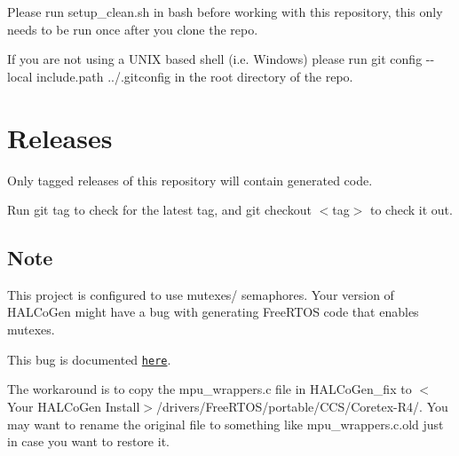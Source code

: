 Please run {\ttfamily setup\+\_\+clean.\+sh} in bash before working with this repository, this only needs to be run once after you clone the repo.

If you are not using a U\+N\+IX based shell (i.\+e. Windows) please run {\ttfamily git config -\/-\/local include.\+path ../.gitconfig} in the root directory of the repo.

\section*{Releases}

Only tagged releases of this repository will contain generated code.

Run {\ttfamily git tag} to check for the latest tag, and {\ttfamily git checkout $<$tag$>$} to check it out.

\subsection*{Note}

This project is configured to use mutexes/ semaphores. Your version of H\+A\+L\+Co\+Gen might have a bug with generating Free\+R\+T\+OS code that enables mutexes.

This bug is documented \href{http://e2e.ti.com/support/microcontrollers/hercules/f/312/p/626490/2320355}{\tt here}.

The workaround is to copy the {\ttfamily mpu\+\_\+wrappers.\+c} file in {\ttfamily H\+A\+L\+Co\+Gen\+\_\+fix} to {\ttfamily $<$Your H\+A\+L\+Co\+Gen Install$>$/drivers/\+Free\+R\+T\+O\+S/portable/\+C\+C\+S/\+Coretex-\/\+R4/}. You may want to rename the original file to something like {\ttfamily mpu\+\_\+wrappers.\+c.\+old} just in case you want to restore it. 